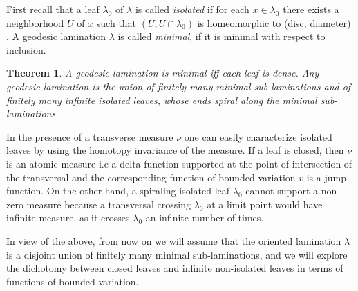 \documentclass{ip-journal}
\newtheorem{theorem}{Theorem}[section]
\theoremstyle{definition}
\numberwithin{equation}{section}
\begin{document}
First
recall  that
a leaf  $\lambda_0$ of $\lambda$ is called {\it{isolated}}  if for each $x \in \lambda_0$ there exists a neighborhood $U$ of $x$ such that $(U, U \cap \lambda_0)$  is homeomorphic to (disc, diameter) \cite[Definition p.46]{casson}.  
 A  geodesic lamination $\lambda$ is called {\it{minimal}}, if it is minimal with respect to inclusion.

\begin{theorem}\label{cassonmin}\cite[Theorem 4.7 and Corollary 4.7.2]{casson}  A geodesic lamination is minimal iff each leaf is dense. Any geodesic lamination is the union of finitely many minimal sub-laminations and of finitely many infinite isolated leaves, whose ends spiral along the minimal sub-laminations.
\end{theorem}
 







In the presence  of a transverse measure $\nu$ one can easily characterize isolated leaves by using the homotopy invariance of the measure. 
If a leaf is closed, then $\nu$ is an atomic measure i.e a delta function supported at the point of intersection of the transversal and the corresponding function of bounded variation $v$ is a jump function. On the other hand, a spiraling isolated leaf $\lambda_0$ cannot support a non-zero measure because a transversal crossing $\lambda_0$  at a limit point  would have infinite measure, as it crosses $\lambda_0$ an infinite number of times.

In view of the above, from now on we will assume that the oriented lamination $\lambda$ is a disjoint union of finitely many minimal sub-laminations,  and
 we will  explore the dichotomy between closed leaves and infinite non-isolated leaves in terms of functions of bounded variation.
\end{document}
